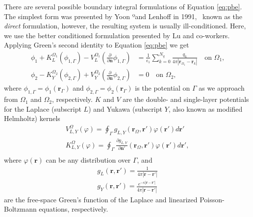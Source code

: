 There are several possible boundary integral formulations of Equation \eqref{eq:pbe}.~\cite{SearchCooperWout2022} The simplest form was presented by Yoon ºand Lenhoff in 1991,~\cite{YoonLenhoff1990} known as the \emph{direct} formulation, however, the resulting system is usually ill-conditioned. Here, we use the better conditioned formulation presented by Lu and co-workers.~\cite{LuETal2006,LuETal2009,ZhangETal2019}
Applying Green's second identity to Equation \eqref{eq:pbe} we get 
%
\begin{align} \label{eq:volume_potential}
\phi_{1}+ K_{L}^{\Omega_1}(\phi_{1,\Gamma}) -  V_{L}^{\Omega_1} \left(\frac{\partial}{\partial \mathbf{n}}  \phi_{1,\Gamma}  \right) & = \frac{1}{\epsilon_1} \sum_{k=0}^{N_q}  \frac{q_k}{4\pi|\mathbf{r}_{\Omega_1} - \mathbf{r}_k|}  \quad \text{on $\Omega_1$,} \nonumber \\
\phi_{2} - K_{Y}^{\Omega_2}(\phi_{2,\Gamma}) + V_{Y}^{\Omega_2} \left( \frac{\partial}{\partial \mathbf{n}} \phi_{2,\Gamma} \right) & = 0 \quad \text{on $\Omega_2$,}
\end{align}
%
where $\phi_{1,\Gamma} = \phi_1(\mathbf{r}_\Gamma)$ and $\phi_{2,\Gamma} = \phi_2(\mathbf{r}_\Gamma)$ is the potential on $\Gamma$ as we approach from $\Omega_1$ and $\Omega_2$, respectively. $K$ and $V$ are the double- and single-layer potentials for the Laplace (subscript $L$) and Yukawa (subscript $Y$, also known as modified Helmholtz) kernels
%
\begin{align}\label{eq:single_double}
V^\Omega_{L,Y}(\varphi) = \oint_\Gamma g_{L,Y}(\mathbf{r}_\Omega,\mathbf{r}')\varphi(\mathbf{r}')d\mathbf{r}'\nonumber\\
K^\Omega_{L,Y}(\varphi) = \oint_\Gamma \frac{\partial g_{L,Y}}{\partial\mathbf{n}'}(\mathbf{r}_\Omega,\mathbf{r}')\varphi(\mathbf{r}')d\mathbf{r}',\nonumber\\
\end{align}
%
where $\varphi(\mathbf{r})$ can be any distribution over $\Gamma$, and 
%
\begin{align}\label{eq:green_func}
g_L(\mathbf{r},\mathbf{r}')=\frac{1}{4\pi|\mathbf{r}-\mathbf{r}'|} \nonumber \\
g_Y(\mathbf{r},\mathbf{r}')=\frac{e^{-\kappa|\mathbf{r}-\mathbf{r}'|}}{4\pi|\mathbf{r}-\mathbf{r}'|}
\end{align}
%
are the free-space Green's function of the Laplace and linearized Poisson-Boltzmann equations, respectively. 

